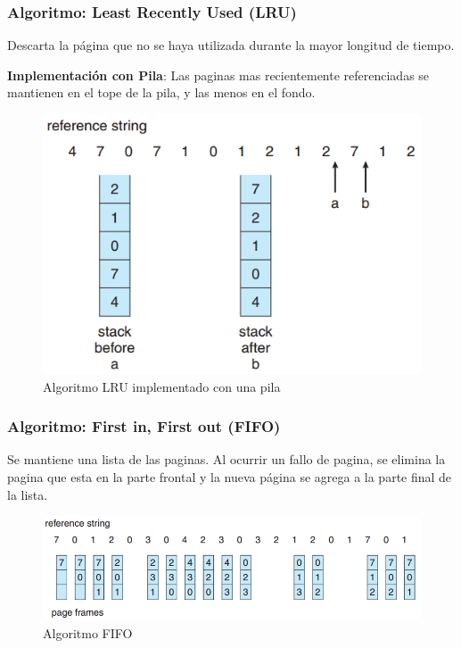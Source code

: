 \documentclass{beamer}
\newcommand{\algTitle}{\textbf{Algoritmo:} }
\begin{document}
\begin{frame}
	\frametitle{\algTitle Least Recently Used (LRU)}
	{\scriptsize Descarta la página que no se haya utilizada durante la mayor longitud de tiempo.}
	
	{\footnotesize \textbf{Implementación con Pila}: Las paginas mas recientemente referenciadas se mantienen en el tope de la pila, y las menos en el fondo.}
	
	\begin{figure}[H]
		\centering
		\includegraphics[scale=0.4]{img/lru2.png}
		\caption{Algoritmo LRU implementado con una pila}
	\end{figure}
	
	
\end{frame}


\begin{frame}
	\frametitle{\algTitle First in, First out (FIFO)}
	Se mantiene una lista de las paginas. Al ocurrir un fallo de pagina, se elimina la pagina que esta en la parte frontal y la nueva página se agrega a la parte final de la lista.
	
	\begin{figure}[H]
		\centering
		\includegraphics[scale=0.5]{img/fifo.png}
		\caption{Algoritmo FIFO}
	\end{figure}
	
	
\end{frame}
\end{document}
